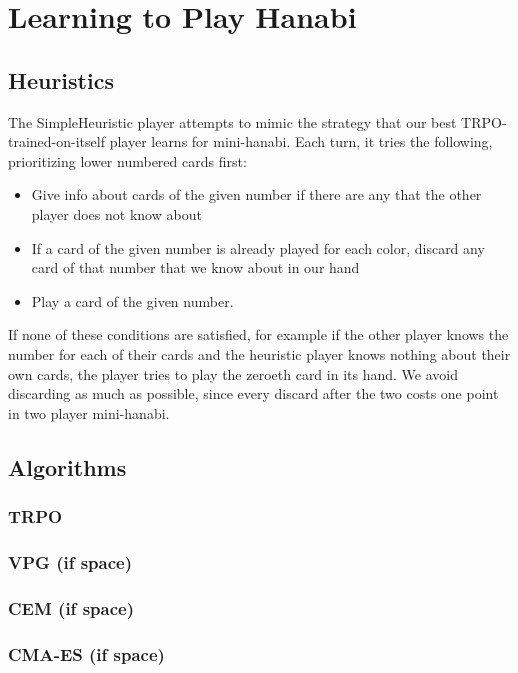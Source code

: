 \section{Learning to Play Hanabi}\label{sec:learninghanabi}


\subsection{Heuristics}

The SimpleHeuristic player attempts to mimic the strategy that our best
TRPO-trained-on-itself player learns for mini-hanabi. Each turn, it tries the
following, prioritizing lower numbered cards first:

\begin{itemize}
\item Give info about cards of the given number if there are any that the other player does not know about
\item If a card of the given number is already played for each color, discard any card of that number that we know about in our hand
\item Play a card of the given number.
\end{itemize}

If none of these conditions are satisfied, for example if the other player
knows the number for each of their cards and the heuristic player knows
nothing about their own cards, the player tries to play the zeroeth card in
its hand. We avoid discarding as much as possible, since every discard after
the two costs one point in two player mini-hanabi.




\subsection{Algorithms}
%
%
\subsubsection{TRPO}
\cite{TRPO}

\subsubsection{VPG (if space)}
\subsubsection{CEM (if space)}
\subsubsection{CMA-ES (if space)}


